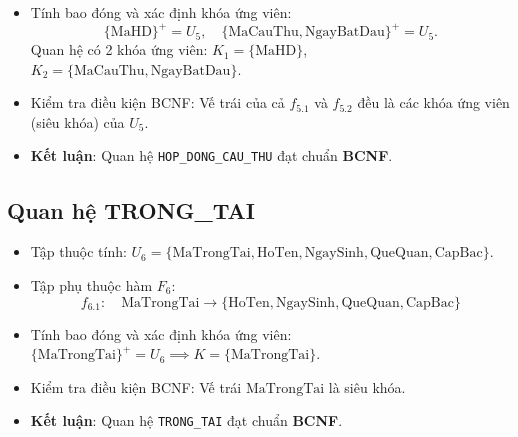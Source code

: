 \begin{itemize}
    \textit{Lưu ý về ràng buộc toàn vẹn thời gian và cơ chế cho mượn}: Ràng buộc một cầu thủ chỉ khoác áo một đội tại một thời điểm ($\text{MaCauThu} \rightarrow \text{MaDoiHienTai}$) và mỗi số áo trong một đội không được trùng nhau ($\{\text{MaDoiHienTai}, \text{SoAo}\} \rightarrow \text{MaCauThu}$) là các ràng buộc theo trạng thái hiệu lực (Temporal Constraints), chỉ áp dụng trên tập con các hợp đồng còn hiệu lực thi đấu ($\text{TrangThai} \in \{\text{'ChinhThuc'}, \text{'ChoMuon'}\}$). Trong cài đặt PostgreSQL, các quy tắc này được hiện thực hóa chuẩn mực bằng \textbf{Chỉ mục duy nhất có điều kiện (Partial Unique Index)} thay vì áp đặt ràng buộc \texttt{UNIQUE} toàn thể (vốn sẽ làm mất tính lưu trữ lịch sử các hợp đồng đã thanh lý). Khi một cầu thủ được CLB chủ quản cho mượn sang CLB khác, hợp đồng gốc tại CLB chủ quản được chuyển sang trạng thái \texttt{'TamDung'} (tạm dừng thi đấu tại CLB chủ quản trong thời hạn cho mượn) để không xung đột với Partial Unique Index, trong khi bản ghi hợp đồng mới được tạo lập với \texttt{TrangThai = 'ChoMuon'}, \texttt{MaDoiChuQuan} giữ nguyên CLB gốc và \texttt{MaDoiHienTai} là CLB tiếp nhận. Khi hết hạn mượn, bản ghi mượn được chuyển sang \texttt{'ThanhLy'} và hợp đồng gốc được kích hoạt lại thành \texttt{'ChinhThuc'}. Nhờ vậy, quyền sở hữu của CLB chủ quản luôn được bảo toàn xuyên suốt lịch sử cơ sở dữ liệu.
    \item Tính bao đóng và xác định khóa ứng viên:
    $$\{\text{MaHD}\}^+ = U_5, \quad \{\text{MaCauThu}, \text{NgayBatDau}\}^+ = U_5.$$
    Quan hệ có 2 khóa ứng viên: $K_1 = \{\text{MaHD}\}$, $K_2 = \{\text{MaCauThu}, \text{NgayBatDau}\}$.
    \item Kiểm tra điều kiện BCNF: Vế trái của cả $f_{5.1}$ và $f_{5.2}$ đều là các khóa ứng viên (siêu khóa) của $U_5$.
    \item \textbf{Kết luận}: Quan hệ \texttt{HOP\_DONG\_CAU\_THU} đạt chuẩn \textbf{BCNF}.
\end{itemize}

\subsection{Quan hệ TRONG\_TAI}
\begin{itemize}
    \item Tập thuộc tính: $U_6 = \{\text{MaTrongTai}, \text{HoTen}, \text{NgaySinh}, \text{QueQuan}, \text{CapBac}\}$.
    \item Tập phụ thuộc hàm $F_6$:
    $$f_{6.1}: \quad \text{MaTrongTai} \rightarrow \{\text{HoTen}, \text{NgaySinh}, \text{QueQuan}, \text{CapBac}\}$$
    \item Tính bao đóng và xác định khóa ứng viên: $\{\text{MaTrongTai}\}^+ = U_6 \implies K = \{\text{MaTrongTai}\}$.
    \item Kiểm tra điều kiện BCNF: Vế trái $\text{MaTrongTai}$ là siêu khóa.
    \item \textbf{Kết luận}: Quan hệ \texttt{TRONG\_TAI} đạt chuẩn \textbf{BCNF}.
\end{itemize}

